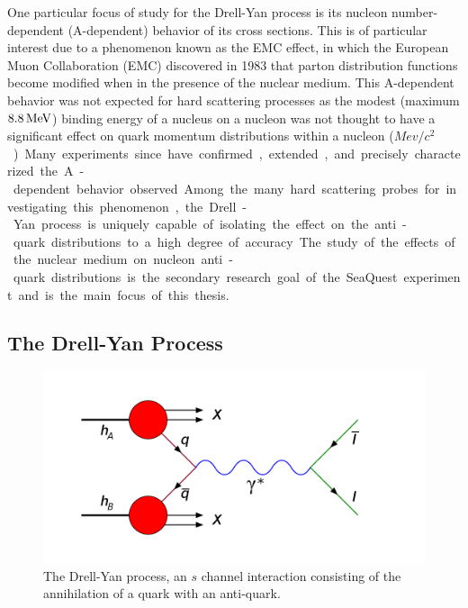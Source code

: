 One particular focus of study for the Drell-Yan process is its nucleon number-dependent (A-dependent) behavior of its cross sections. This is of particular interest due to a phenomenon known as the EMC effect, in which the European Muon Collaboration (EMC) discovered in 1983 that parton distribution functions become modified when in the presence of the nuclear medium. This A-dependent behavior was not expected for hard scattering processes as the modest (maximum $\unit[8.8]{MeV}$) binding energy of a nucleus on a nucleon was not thought to have a significant effect on quark momentum distributions within a nucleon (\unit[938]{$Mev/c^2$}). Many experiments since have confirmed, extended, and precisely characterized the A-dependent behavior observed. Among the many hard scattering probes for investigating this phenomenon, the Drell-Yan process is uniquely capable of isolating the effect on the anti-quark distributions to a high degree of accuracy. The study of the effects of the nuclear medium on nucleon anti-quark distributions is the secondary research goal of the SeaQuest experiment and is the main focus of this thesis.

\subsection{The Drell-Yan Process}

\begin{figure}[h]
	\centering
	\includegraphics[width=4.5in]{figures/background/Drell-Yan.png}
	\caption{The Drell-Yan process, an $s$ channel interaction consisting of the annihilation of a quark with an anti-quark.}
	\label{fig:dy-diagram}
\end{figure}

